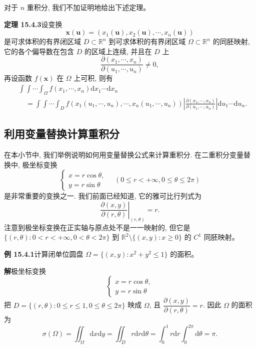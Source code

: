 \documentclass[UTF8,12pt,a4paper,fontset=fandol]{ctexart}
\begin{document}
对于 $n$ 重积分, 我们不加证明地给出下述定理。

\noindent\textbf{定理 15.4.3}\quad 设变换
\[
  \boldsymbol x(\boldsymbol u)=(x_1(\boldsymbol u),x_2(\boldsymbol u),\cdots,x_n(\boldsymbol u))
\]
是可求体积的有界闭区域 $D\subset\mathbb R^n$ 到可求体积的有界闭区域 $\Omega\subset\mathbb R^n$ 的同胚映射, 它的各个偏导数在包含 $D$ 的区域上连续, 并且在 $D$ 上
\[
  \frac{\partial(x_1,\cdots,x_n)}{\partial(u_1,\cdots,u_n)}\ne0,
\]
再设函数 $f(\boldsymbol x)$ 在 $\Omega$ 上可积, 则有
\[
\begin{aligned}
  &\int\!\!\int\cdots\int_\Omega f(x_1,\cdots,x_n)\mathrm dx_1\cdots\mathrm dx_n\\
  &\quad=\int\!\!\int\cdots\int_D
  f(x_1(u_1,\cdots,u_n),\cdots,x_n(u_1,\cdots,u_n))
  \left|\frac{\partial(x_1,\cdots,x_n)}{\partial(u_1,\cdots,u_n)}\right|
  \mathrm du_1\cdots\mathrm du_n.
\end{aligned}
\]

\subsection{利用变量替换计算重积分}

在本小节中, 我们举例说明如何用变量替换公式来计算重积分. 在二重积分变量替换中, 极坐标变换
\[
  \begin{cases}
    x=r\cos\theta,\\
    y=r\sin\theta
  \end{cases}
  \quad(0\leqslant r<+\infty,0\leqslant\theta\leqslant2\pi)
\]
是非常重要的变换之一. 我们前面已经知道, 它的雅可比行列式为
\[
  \left.\frac{\partial(x,y)}{\partial(r,\theta)}\right|_{(r,\theta)}=r.
\]
注意到极坐标变换在正实轴与原点处不是一一映射的, 但它是 $\{(r,\theta):0<r<+\infty,0<\theta<2\pi\}$ 到 $\mathbb R^2\setminus\{(x,y):x\geqslant0\}$ 的 $C^1$ 同胚映射。

\noindent\textbf{例 15.4.1}\quad 计算闭单位圆盘 $\Omega=\{(x,y):x^2+y^2\leqslant1\}$ 的面积。

\noindent\textbf{解}\quad 极坐标变换
\[
  \begin{cases}
    x=r\cos\theta,\\
    y=r\sin\theta
  \end{cases}
\]
把 $D=\{(r,\theta):0\leqslant r\leqslant1,0\leqslant\theta\leqslant2\pi\}$ 映成 $\Omega$, 且 $\dfrac{\partial(x,y)}{\partial(r,\theta)}=r$. 因此 $\Omega$ 的面积为
\[
  \sigma(\Omega)=\iint_\Omega\mathrm dx\mathrm dy
  =\iint_D r\mathrm dr\mathrm d\theta
  =\int_0^1 r\mathrm dr\int_0^{2\pi}\mathrm d\theta=\pi.
\]
\end{document}
